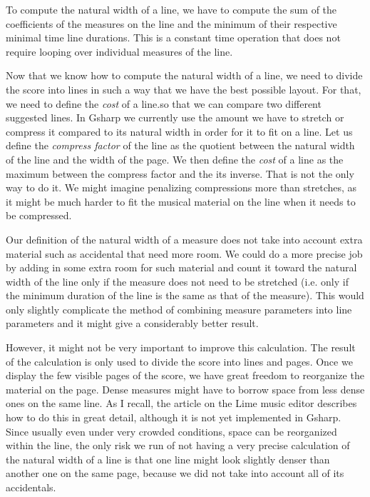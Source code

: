 \documentclass[11pt]{book}
\def\gs{Gsharp}
\begin{document}
To compute the natural width of a line, we have to compute the sum of
the coefficients of the measures on the line and the minimum of their
respective minimal time line durations.  This is a constant time
operation that does not require looping over individual measures of
the line.  

Now that we know how to compute the natural width of a line, we need
to divide the score into lines in such a way that we have the best
possible layout.  For that, we need to define the \emph{cost} of a
line.so that we can compare two different suggested lines.  In {\gs}
we currently use the amount we have to stretch or compress it compared
to its natural width in order for it to fit on a line.  Let us define
the \emph{compress factor} of the line as the quotient between the
natural width of the line and the width of the page.  We then define
the \emph{cost} of a line as the maximum between the compress factor
and the its inverse.  That is not the only way to do it.  We might
imagine penalizing compressions more than stretches, as it might be
much harder to fit the musical material on the line when it needs to
be compressed. 

Our definition of the natural width of a measure does not take into
account extra material such as accidental that need more room.  We
could do a more precise job by adding in some extra room for such
material and count it toward the natural width of the line only if the
measure does not need to be stretched (i.e. only if the minimum
duration of the line is the same as that of the measure).  This would
only slightly complicate the method of combining measure parameters
into line parameters and it might give a considerably better result. 

However, it might not be very important to improve this calculation.
The result of the calculation is only used to divide the score into
lines and pages.  Once we display the few visible pages of the score,
we have great freedom to reorganize the material on the page.  Dense
measures might have to borrow space from less dense ones on the same
line.  As I recall, the article on the Lime music editor describes how
to do this in great detail, although it is not yet implemented in
{\gs}.  Since usually even under very crowded conditions, space can be
reorganized within the line, the only risk we run of not having a very
precise calculation of the natural width of a line is that one line
might look slightly denser than another one on the same page, because
we did not take into account all of its accidentals. 
\end{document}
